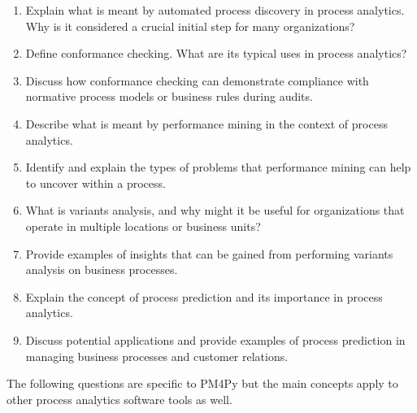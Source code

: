 \begin{enumerate}[nosep]
    \item Explain what is meant by automated process discovery in process analytics. Why is it considered a crucial initial step for many organizations?
    \item Define conformance checking. What are its typical uses in process analytics?
    \item Discuss how conformance checking can demonstrate compliance with normative process models or business rules during audits.
    \item Describe what is meant by performance mining in the context of process analytics.
    \item Identify and explain the types of problems that performance mining can help to uncover within a process.
    \item What is variants analysis, and why might it be useful for organizations that operate in multiple locations or business units?
    \item Provide examples of insights that can be gained from performing variants analysis on business processes.
    \item Explain the concept of process prediction and its importance in process analytics.
    \item Discuss potential applications and provide examples of process prediction in managing business processes and customer relations.
\end{enumerate}

The following questions are specific to PM4Py but the main concepts apply to other process analytics software tools as well.

